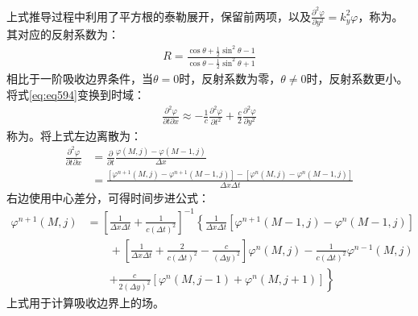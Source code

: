 \documentclass{article}
\numberwithin{equation}{section}
\begin{document}
上式推导过程中利用了平方根的泰勒展开，保留前两项，以及$\frac{\partial^2\varphi}{\partial y^2}=k_y^2\varphi$，称为\textbf{\color{blue}{二阶吸收边界条件}}。其对应的反射系数为：
\begin{align}
    \label{eq:eq595}
    R=\frac{\cos\theta+\frac{1}{2}\sin^2\theta-1}{\cos\theta-\frac{1}{2}\sin^2\theta+1}
\end{align}
相比于一阶吸收边界条件，当$\theta=0$时，反射系数为零，$\theta\neq0$时，反射系数更小。将式\ref{eq:eq594}变换到时域：
\begin{align}
    \label{eq:eq596}
    \frac{\partial^2 \varphi}{\partial t\partial x}\approx-\frac{1}{c}\frac{\partial^2 \varphi}{\partial t^2}+\frac{c}{2}\frac{\partial^2 \varphi}{\partial y^2}
\end{align}
称为\textbf{\color{blue}{Engquist-Majda吸收边界条件}}。将上式左边离散为：
\begin{align}
    \label{eq:eq597}
    \frac{\partial^2 \varphi}{\partial t\partial x}&=\frac{\partial}{\partial t}\frac{\varphi(M,j)-\varphi(M-1,j)}{\Delta x} \nonumber \\
                                                   &=\frac{[\varphi^{n+1}(M,j)-\varphi^{n+1}(M-1,j)]-[\varphi^{n}(M,j)-\varphi^{n}(M-1,j)]}{\Delta x\Delta t}
\end{align}
右边使用中心差分，可得时间步进公式：
\begin{align}
    \label{eq:eq598}
    \varphi^{n+1}(M,j)&=\left[\frac{1}{\Delta x\Delta t}+\frac{1}{c(\Delta t)^2}\right]^{-1}\left\{\frac{1}{\Delta x\Delta t}\left[\varphi^{n+1}(M-1,j)-\varphi^{n}(M-1,j)\right]\right. \nonumber \\
                      &\qquad+\left[\frac{1}{\Delta x\Delta t}+\frac{2}{c(\Delta t)^2}-\frac{c}{(\Delta y)^2}\right]\varphi^{n}(M,j)-\frac{1}{c(\Delta t)^2}\varphi^{n-1}(M,j) \nonumber \\
                      &\qquad\left.+\frac{c}{2(\Delta y)^2}\left[\varphi^{n}(M,j-1)+\varphi^{n}(M,j+1)\right]\right\}
\end{align}
上式用于计算吸收边界上的场。
\end{document}
